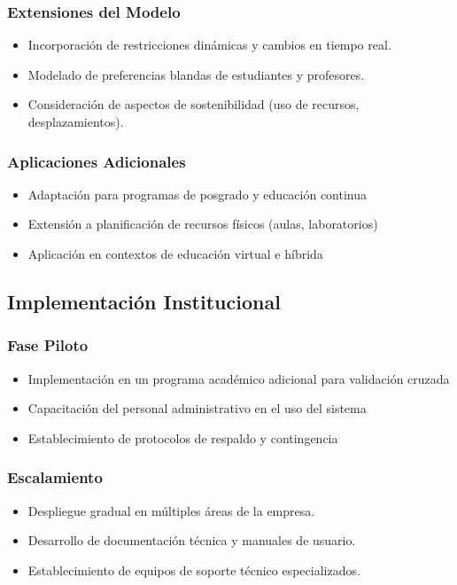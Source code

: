 \subsubsection{Extensiones del Modelo}
\begin{itemize}
    \item Incorporación de restricciones dinámicas y cambios en tiempo real.
    \item Modelado de preferencias blandas de estudiantes y profesores.
    \item Consideración de aspectos de sostenibilidad (uso de recursos, desplazamientos).
\end{itemize}

\subsubsection{Aplicaciones Adicionales}
\begin{itemize}
    \item Adaptación para programas de posgrado y educación continua
    \item Extensión a planificación de recursos físicos (aulas, laboratorios)
    \item Aplicación en contextos de educación virtual e híbrida
\end{itemize}

\subsection{Implementación Institucional}

\subsubsection{Fase Piloto}
\begin{itemize}
    \item Implementación en un programa académico adicional para validación cruzada
    \item Capacitación del personal administrativo en el uso del sistema
    \item Establecimiento de protocolos de respaldo y contingencia
\end{itemize}

\subsubsection{Escalamiento}
\begin{itemize}
    \item Despliegue gradual en múltiples áreas de la empresa.
    \item Desarrollo de documentación técnica y manuales de usuario.
    \item Establecimiento de equipos de soporte técnico especializados.
\end{itemize}

